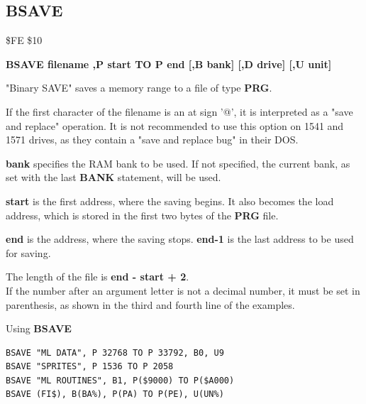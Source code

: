 \subsection{BSAVE}
\begin{description}[leftmargin=2cm,style=nextline]
\item [Token:] \$FE \$10
\item [Format:] {\bf BSAVE filename ,P start TO P end
                [,B bank] [,D drive] [,U unit] }
\item [Usage:]
   "Binary SAVE" saves a memory range to a file of type {\bf PRG}.

   \filenamedefinition
   If the first character of the filename is an at sign '@', it
   is interpreted as a "save and replace" operation. It is not recommended
   to use this option on 1541 and 1571 drives, as they
   contain a "save and replace bug" in their DOS.

   {\bf bank} specifies the RAM bank to be used.
   If not specified, the current bank, as set with the last
   {\bf BANK} statement, will be used.

   {\bf start} is the first address, where the saving begins.
   It also becomes the load address,
   which is stored in the first two bytes of the {\bf PRG} file.

   {\bf end} is the address, where the saving stops.
   {\bf end-1} is the last address to be used for saving.

   \drivedefinition

   \unitdefinition

\item [Remarks:]
   The length of the file is {\bf end - start + 2}. \\
   If the number after an argument letter is not a decimal
   number, it must be set in parenthesis, as shown
   in the third and fourth line of the examples.


\item [Examples:] Using {\bf BSAVE}
\begin{tcolorbox}[colback=black,coltext=white]
\verbatimfont{\codefont}
\begin{verbatim}
BSAVE "ML DATA", P 32768 TO P 33792, B0, U9
BSAVE "SPRITES", P 1536 TO P 2058
BSAVE "ML ROUTINES", B1, P($9000) TO P($A000)
BSAVE (FI$), B(BA%), P(PA) TO P(PE), U(UN%)
\end{verbatim}
\end{tcolorbox}
\end{description}

